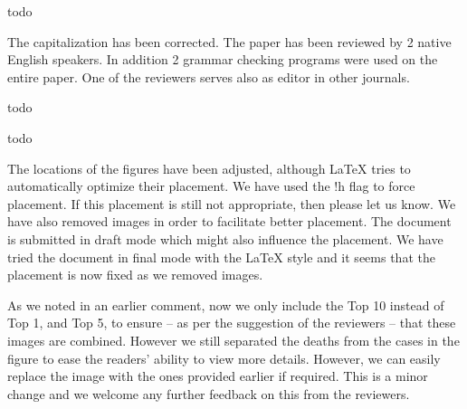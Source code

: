   { todo}


{The capitalization has been corrected. The paper has been reviewed by
  2 native English speakers. In addition 2 grammar checking programs
  were used on the entire paper. One of the reviewers serves also as
  editor in other journals.}


  { todo}


  { todo}


  {The locations of the figures have been adjusted, although LaTeX tries to automatically optimize their
  placement. We have used the !h flag to force placement. If this
  placement is still not appropriate, then please let us know. We have also
  removed images in order to facilitate better placement. The
  document is submitted in draft mode which might also influence the
  placement. We have tried the document in final mode with the LaTeX
  style and it seems that the placement is now fixed as we removed images.}


  {As we noted in an earlier comment, now we only include the
  Top 10 instead of Top 1, and Top 5, to ensure -- as per the suggestion of the
  reviewers -- that these images are combined. However we still separated
  the deaths from the cases in the figure to ease the readers' ability to view
  more details. However, we can easily replace the image with the ones
  provided earlier if required. This is a minor change and we welcome any further feedback on this from the reviewers.}


